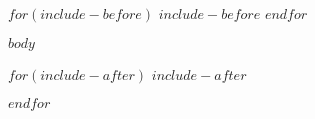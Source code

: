 
$for(include-before)$
$include-before$
$endfor$



$body$


$for(include-after)$
$include-after$

$endfor$

